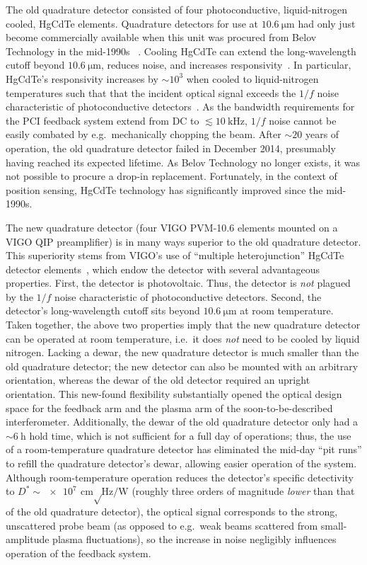 The old quadrature detector consisted of four
photoconductive, liquid-nitrogen cooled, HgCdTe elements.
Quadrature detectors for use at $\SI{10.6}{\micro\meter}$
had only just become commercially available
when this unit was procured from Belov Technology in the mid-1990s
~\cite[Sec.~3.5(b)]{coda_phd}.
Cooling HgCdTe can
extend the long-wavelength cutoff beyond $\SI{10.6}{\micro\meter}$,
reduces noise, and
increases responsivity~\cite{vigo_catalog}.
In particular, HgCdTe's responsivity increases by $\sim 10^3$
when cooled to liquid-nitrogen temperatures such that
that the incident optical signal
exceeds the $1 / f$ noise
characteristic of photoconductive detectors~\cite{vigo_catalog}.
As the bandwidth requirements for the PCI feedback system
extend from DC to $\lesssim \SI{10}{\kilo\hertz}$,
$1 / f$ noise cannot be easily combated by
e.g.\ mechanically chopping the beam.
After $\sim 20$ years of operation,
the old quadrature detector failed in December 2014,
presumably having reached its expected lifetime.
As Belov Technology no longer exists,
it was not possible to procure a drop-in replacement.
Fortunately, in the context of position sensing,
HgCdTe technology has significantly improved since the mid-1990s.

The new quadrature detector
(four VIGO PVM-10.6 elements mounted on a VIGO QIP preamplifier)
is in many ways superior to the old quadrature detector.
This superiority stems from VIGO's use of
``multiple heterojunction'' HgCdTe detector elements~\cite{vigo_catalog},
which endow the detector with several advantageous properties.
First, the detector is photovoltaic.
Thus, the detector is \emph{not} plagued by the $1 / f$ noise
characteristic of photoconductive detectors.
Second, the detector's long-wavelength cutoff
sits beyond $\SI{10.6}{\micro\meter}$ at room temperature.
Taken together, the above two properties imply that
the new quadrature detector can be operated at room temperature,
i.e.\ it does \emph{not} need to be cooled by liquid nitrogen.
Lacking a dewar, the new quadrature detector
is much smaller than the old quadrature detector;
the new detector can also be mounted with an arbitrary orientation,
whereas the dewar of the old detector required an upright orientation.
This new-found flexibility substantially opened
the optical design space for the feedback arm and
the plasma arm of the soon-to-be-described interferometer.
Additionally, the dewar of the old quadrature detector
only had a $\sim \SI{6}{\hour}$ hold time,
which is not sufficient for a full day of \diiid \space operations;
thus, the use of a room-temperature quadrature detector has
eliminated the mid-day ``pit runs'' to refill the quadrature detector's dewar,
allowing easier operation of the system.
Although room-temperature operation reduces
the detector's specific detectivity to
$D^* \sim \SI{e7}{\centi\meter \sqrt\hertz \per\watt}$
(roughly three orders of magnitude \emph{lower} than
that of the old quadrature detector),
the optical signal corresponds to the strong, unscattered probe beam
(as opposed to e.g.\ weak beams
scattered from small-amplitude plasma fluctuations), so
the increase in noise negligibly influences operation of the feedback system.

